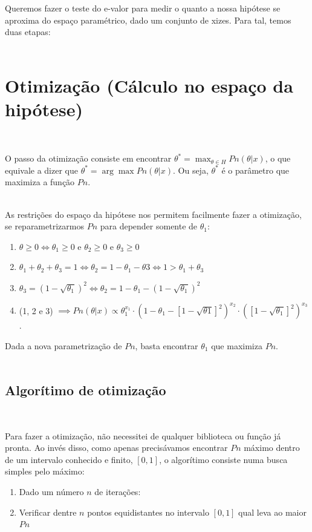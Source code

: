 \documentclass[pt12]{article}
\begin{document}
Queremos fazer o teste do e-valor para medir o quanto a nossa hipótese se aproxima do espaço paramétrico, dado um conjunto de xizes. Para tal, temos duas etapas:\\
\ 

\section{Otimização (Cálculo no espaço da hipótese)}
\ 

O passo da otimização consiste em encontrar $\theta^* = \max_{\theta \in H}Pn(\theta|x)$, o que equivale a dizer que $\theta^* = \arg\max Pn(\theta|x)$. Ou seja, $\theta^*$ é o parâmetro que maximiza a função $Pn$.\\
\ 

As restrições do espaço da hipótese nos permitem facilmente fazer a otimização, se reparametrizarmos $Pn$ para depender somente de $\theta_1$:

\begin{enumerate}
\item $\theta \geq 0 \iff \theta_1 \geq 0 \text{ e } \theta_2 \geq 0 \text{ e } \theta_3 \geq 0$
\item $\theta_1+\theta_2+\theta_3 = 1 \iff \theta_2 = 1 - \theta_1 - \theta3 \iff 1 > \theta_1 + \theta_3$
\item $\theta_3 = (1-\sqrt{\theta_1})^2 \iff \theta_2 = 1 - \theta_1 - (1-\sqrt{\theta_1})^2$
\item (1, 2 e 3) $\implies \displaystyle{Pn(\theta |x) \propto \theta_1^{x_1}\cdot(1 - \theta_1 - [1 - \sqrt{\theta1}]^2)^{x_2}\cdot([1-\sqrt{\theta_1}]^2)^{x_3}}$.
\end{enumerate}

Dada a nova parametrização de $Pn$, basta encontrar $\theta_1$ que maximiza $Pn$.\\
\ 

\subsection{Algorítimo de otimização}
\ 

Para fazer a otimização, não necessitei de qualquer biblioteca ou função já pronta. Ao invés disso, como apenas precisávamos encontrar $Pn$ máximo dentro de um intervalo conhecido e finito, $[0,1]$, o algorítimo consiste numa busca simples pelo máximo:

\begin{enumerate}
\item Dado um número $n$ de iterações:
\item Verificar dentre $n$ pontos equidistantes no intervalo $[0,1]$ qual leva ao maior $Pn$
\end{enumerate}
\end{document}
